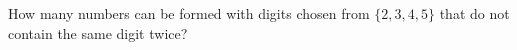 How many numbers can be formed with digits chosen from $\{2, 3, 4, 5\}$ that do not contain the same digit twice?
